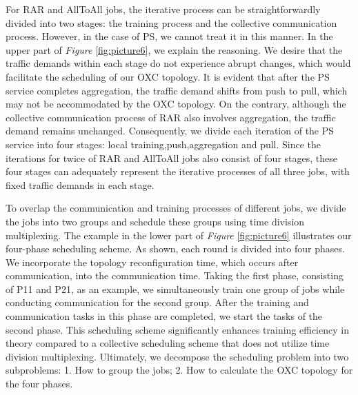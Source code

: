 \documentclass[conference]{IEEEtran}
\begin{document}
For RAR and AllToAll jobs, the iterative process can be straightforwardly divided into two stages: the training process and the collective communication process. However, in the case of PS, we cannot treat it in this manner. In the upper part of \emph{Figure} \ref{fig:picture6}, we explain the reasoning. We desire that the traffic demands within each stage do not experience abrupt changes, which would facilitate the scheduling of our OXC topology. It is evident that after the PS service completes aggregation, the traffic demand shifts from push to pull, which may not be accommodated by the OXC topology. On the contrary, although the collective communication process of RAR also involves aggregation, the traffic demand remains unchanged. Consequently, we divide each iteration of the PS service into four stages: local training,push,aggregation and pull. Since the iterations for twice of RAR and AllToAll jobs also consist of four stages, these four stages can adequately represent the iterative processes of all three jobs, with fixed traffic demands in each stage.


To overlap the communication and training processes of different jobs, we divide the jobs into two groups and schedule these groups using time division multiplexing. The example in the lower part of \emph{Figure} \ref{fig:picture6} illustrates our four-phase scheduling scheme. As shown, each round is divided into four phases. We incorporate the topology reconfiguration time, which occurs after communication, into the communication time. Taking the first phase, consisting of P11 and P21, as an example, we simultaneously train one group of jobs while conducting communication for the second group. After the training and communication tasks in this phase are completed, we start the tasks of the second phase. This scheduling scheme significantly enhances training efficiency in theory compared to a collective scheduling scheme that does not utilize time division multiplexing. Ultimately, we decompose the scheduling problem into two subproblems: 1. How to group the jobs; 2. How to calculate the OXC topology for the four phases.
\end{document}
